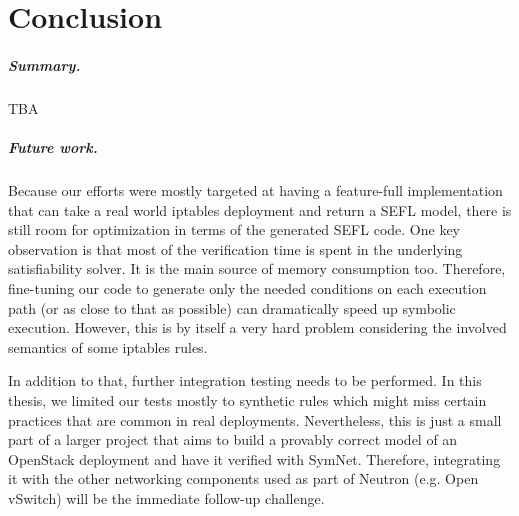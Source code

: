 \chapter{Conclusion}

\paragraph{Summary.} TBA

\paragraph{Future work.}
Because our efforts were mostly targeted at having a feature-full
implementation that can take a real world iptables deployment and return a SEFL
model, there is still room for optimization in terms of the generated SEFL
code.  One key observation is that most of the verification time is spent in
the underlying satisfiability solver.  It is the main source of memory
consumption too.  Therefore, fine-tuning our code to generate only the needed
conditions on each execution path (or as close to that as possible) can
dramatically speed up symbolic execution.  However, this is by itself a very
hard problem considering the involved semantics of some iptables rules.

In addition to that, further integration testing needs to be performed.  In
this thesis, we limited our tests mostly to synthetic rules which might miss
certain practices that are common in real deployments.  Nevertheless, this is
just a small part of a larger project that aims to build a provably correct
model of an OpenStack deployment and have it verified with SymNet.  Therefore,
integrating it with the other networking components used as part of Neutron
(e.g. Open vSwitch) will be the immediate follow-up challenge.
